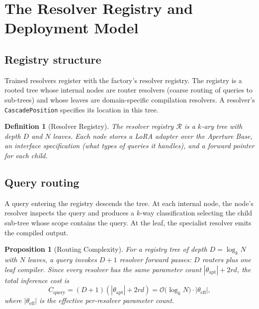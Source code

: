 \documentclass[twocolumn,11pt,a4paper]{article}
\newtheorem{proposition}[theorem]{Proposition}
\newtheorem{definition}[theorem]{Definition}
\newcommand{\cR}{\mathcal{R}}
\begin{document}
\section{The Resolver Registry and Deployment Model}
\label{sec:registry}

\subsection{Registry structure}

Trained resolvers register with the factory's resolver registry. The registry is a rooted tree whose internal nodes are router resolvers (coarse routing of queries to sub-trees) and whose leaves are domain-specific compilation resolvers. A resolver's \texttt{CascadePosition} specifies its location in this tree.

\begin{definition}[Resolver Registry]
\label{def:registry}
The \emph{resolver registry} $\cR$ is a $k$-ary tree with depth $D$ and $N$ leaves. Each node stores a LoRA adapter over the Aperture Base, an interface specification (what types of queries it handles), and a forward pointer for each child.
\end{definition}

\subsection{Query routing}

A query entering the registry descends the tree. At each internal node, the node's resolver inspects the query and produces a $k$-way classification selecting the child sub-tree whose scope contains the query. At the leaf, the specialist resolver emits the compiled output.

\begin{proposition}[Routing Complexity]
\label{prop:routing-complexity}
For a registry tree of depth $D = \log_k N$ with $N$ leaves, a query invokes $D + 1$ resolver forward passes: $D$ routers plus one leaf compiler. Since every resolver has the same parameter count $|\theta_{\mathrm{apt}}| + 2rd$, the total inference cost is
\begin{equation}
C_{\mathrm{query}} = (D + 1)(|\theta_{\mathrm{apt}}| + 2rd) = \mathcal{O}\bigl(\log_k N\bigr) \cdot |\theta_{\mathrm{eff}}|,
\end{equation}
where $|\theta_{\mathrm{eff}}|$ is the effective per-resolver parameter count.
\end{proposition}
\end{document}
